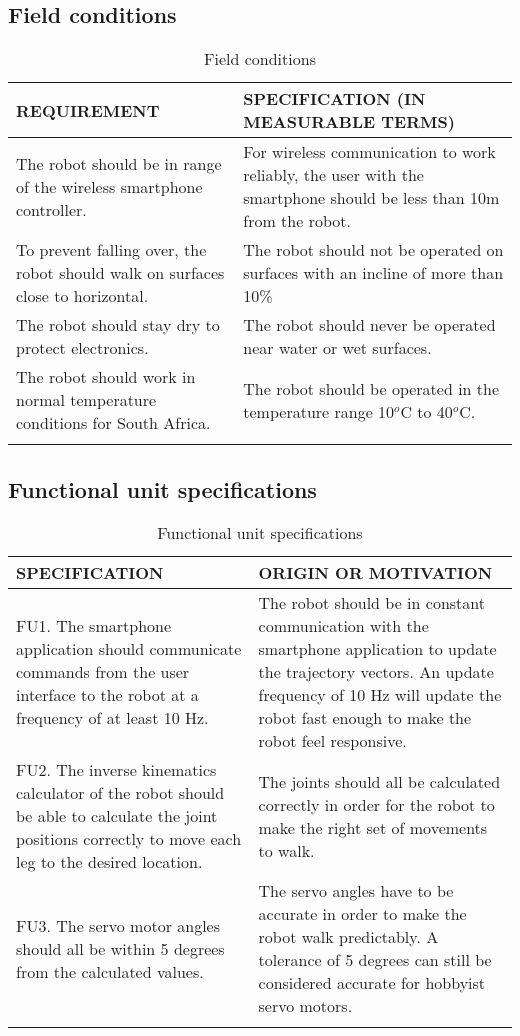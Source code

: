 \subsection{Field conditions}

\begin{center}
\begin{longtable}{|p{7.5cm}|p{7.5cm}|}
\hline
  \textbf{REQUIREMENT} &
  \textbf{SPECIFICATION (IN MEASURABLE TERMS)} \\
\hline The robot should be in range of the wireless smartphone controller.
   & For wireless communication to work reliably, the user with the smartphone should be less than 10m from the robot.
   \\
\hline To prevent falling over, the robot should walk on surfaces close to horizontal.
   & The robot should not be operated on surfaces with an incline of more than 10\%
   \\
\hline The robot should stay dry to protect electronics.
   & The robot should never be operated near water or wet surfaces.
   \\
\hline The robot should work in normal temperature conditions for South Africa.
& The robot should be operated in the temperature range 10$^o$C to 40$^o$C.
\\
\hline
\caption{Field conditions}
\end{longtable}
\end{center}

\subsection{Functional unit specifications}

\begin{center}
\begin{longtable}{|p{7.5cm}|p{7.5cm}|}
\hline
  \textbf{SPECIFICATION} & \textbf{ORIGIN OR MOTIVATION} \\
\hline FU1. The smartphone application should communicate commands from the user interface to the robot at a frequency of at least 10 Hz.
   & The robot should be in constant communication with the smartphone application to update the trajectory vectors. An update frequency of 10 Hz will update the robot fast enough to make the robot feel responsive.
\\
\hline FU2. The inverse kinematics calculator of the robot should be able to calculate the joint positions correctly to move each leg to the desired location.
   & The joints should all be calculated correctly in order for the robot to make the right set of movements to walk.
   \\
\hline FU3. The servo motor angles should all be within 5 degrees from the calculated values.
& The servo angles have to be accurate in order to make the robot walk predictably. A tolerance of 5 degrees can still be considered accurate for hobbyist servo motors.
\\
\hline
\caption{Functional unit specifications}
\end{longtable}
\end{center}

\newpage



